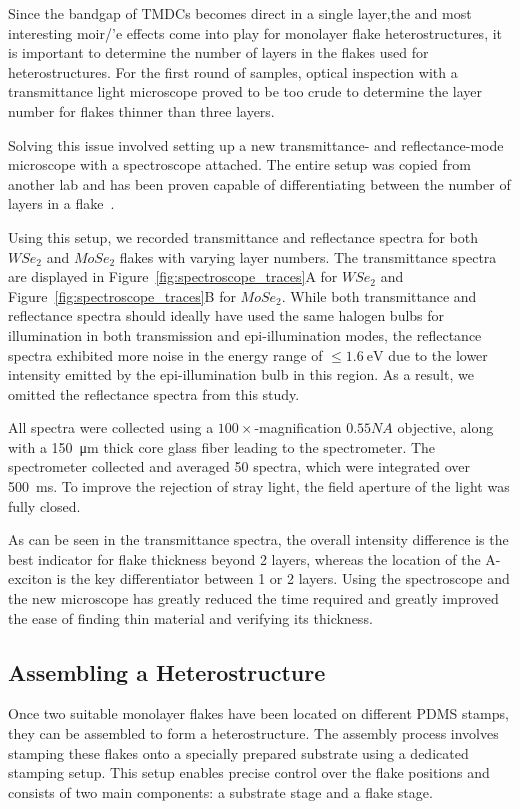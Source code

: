 \vspace{1cm}

Since the bandgap of TMDCs becomes direct in a single layer,the  and most interesting moir/'e effects come into play for monolayer flake heterostructures, it is important to determine the number of layers in the flakes used for heterostructures. 
For the first round of samples, optical inspection with a transmittance light microscope proved to be too crude to determine the layer number for flakes thinner than three layers.

Solving this issue involved setting up a new transmittance- and reflectance-mode microscope with a spectroscope attached. The entire setup was copied from another lab and has been proven capable of differentiating between the number of layers in a flake~\cite{frisendaMicroreflectanceTransmittanceSpectroscopy2017,niuThicknessDependentDifferentialReflectance2018}.

Using this setup, we recorded transmittance and reflectance spectra for both $WSe_2$ and $MoSe_2$ flakes with varying layer numbers.
%
The transmittance spectra are displayed in Figure~\ref{fig:spectroscope_traces}A for $WSe_2$ and Figure~\ref{fig:spectroscope_traces}B for $MoSe_2$. 
%
While both transmittance and reflectance spectra should ideally have used the same halogen bulbs for illumination in both transmission and epi-illumination modes, the reflectance spectra exhibited more noise in the energy range of $\leq \SI{1.6}{\electronvolt}$ due to the lower intensity emitted by the epi-illumination bulb in this region. As a result, we omitted the reflectance spectra from this study.

All spectra were collected using a $100\times$-magnification $0.55NA$ objective, along with a \SI{150}{\micro\meter} thick core glass fiber leading to the spectrometer. 
%
The spectrometer collected and averaged 50 spectra, which were integrated over \SI{500}{\milli\second}. To improve the rejection of stray light, the field aperture of the light was fully closed.

As can be seen in the transmittance spectra, the overall intensity difference is the best indicator for flake thickness beyond 2 layers, whereas the location of the A-exciton is the key differentiator between 1 or 2 layers. 
%
Using the spectroscope and the new microscope has greatly reduced the time required and greatly improved the ease of finding thin material and verifying its thickness.

\subsection{Assembling a Heterostructure}
%
Once two suitable monolayer flakes have been located on different PDMS stamps, they can be assembled to form a heterostructure.
%
The assembly process involves stamping these flakes onto a specially prepared substrate using a dedicated stamping setup.
%
This setup enables precise control over the flake positions and consists of two main components: a substrate stage and a flake stage.

